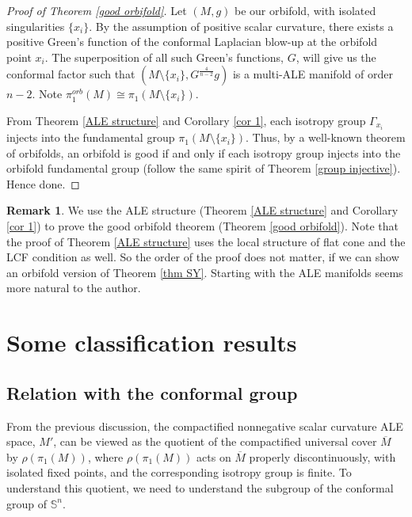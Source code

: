\documentclass[12pt]{amsart}
\theoremstyle{definition}
\newtheorem{remark}[theorem]{Remark}
\begin{document}
\begin{proof}[Proof of Theorem \ref{good orbifold}]
    Let $(M,g)$ be our orbifold, with isolated singularities $\{x_i\}$. By the assumption of positive scalar curvature, there exists a positive Green's function of the conformal Laplacian blow-up at the orbifold point $x_i$. The superposition of all such Green's functions, $G$, will give us the conformal factor such that $(M\setminus\{x_i\}, G^{\frac{4}{n-2}}g)$ is a multi-ALE manifold of order $n-2$. Note $\pi_1^{orb}(M) \cong \pi_1(M\setminus\{x_i\})$.

    From Theorem \ref{ALE structure} and Corollary \ref{cor 1}, each isotropy group $\Gamma_{x_i}$ injects into the fundamental group $\pi_1(M\setminus\{x_i\})$. Thus, by a well-known theorem of orbifolds, an orbifold is good if and only if each isotropy group injects into the orbifold fundamental group (follow the same spirit of Theorem \ref{group injective}). Hence done. 
\end{proof}
\begin{remark}
    We use the ALE structure (Theorem \ref{ALE structure} and Corollary \ref{cor 1}) to prove the good orbifold theorem (Theorem \ref{good orbifold}). Note that the proof of Theorem \ref{ALE structure} uses the local structure of flat cone and the LCF condition as well. So the order of the proof does not matter, if we can show an orbifold version of Theorem \ref{thm SY}. Starting with the ALE manifolds seems more natural to the author.
\end{remark}


\section{Some classification results}

\subsection{Relation with the conformal group}
From the previous discussion, the compactified nonnegative scalar curvature ALE space, $M'$, can be viewed as the quotient of the compactified universal cover $\overline{M}$ by $\rho(\pi_1(M))$, where $\rho(\pi_1(M))$ acts on $\overline{M}$ properly discontinuously, with isolated fixed points, and the corresponding isotropy group is finite. To understand this quotient, we need to understand the subgroup of the conformal group of $\mathbb{S}^n$.
\end{document}
